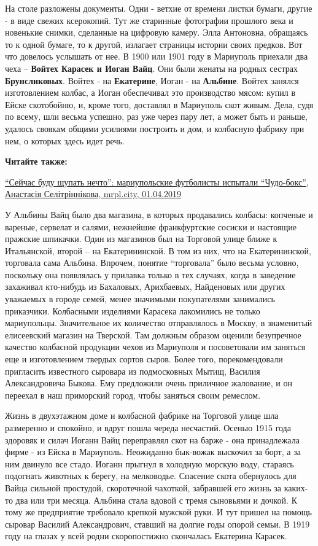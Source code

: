 На столе разложены документы. Одни - ветхие от времени листки бумаги, другие -
в виде свежих ксерокопий. Тут же старинные фотографии прошлого века и новенькие
снимки, сделанные на цифровую камеру. Элла Антоновна, обращаясь то к одной
бумаге, то к другой, излагает страницы истории своих предков. Вот что довелось
услышать от нее. В 1900 или 1901 году в Мариуполь приехали два чеха – \textbf{Войтех
Карасек и Иоган Вайц}. Они были женаты на родных сестрах \textbf{Брунсликовых}. Войтех -
на \textbf{Екатерине}, Иоган - на \textbf{Альбине}. Войтех занялся изготовлением колбас, а Иоган
обеспечивал это производство мясом: купил в Ейске скотобойню, и, кроме того,
доставлял в Мариуполь скот живым. Дела, судя по всему, шли весьма успешно, раз
уже через пару лет, а может быть и раньше, удалось своякам общими усилиями
построить и дом, и колбасную фабрику при нем, о которых здесь идет речь.

\textbf{Читайте также:} 

\href{https://mrpl.city/news/view/sejchas-budu-shhupat-nechto-mariupolskie-futbolisty-ispytali-chudoboks-video}{%
\enquote{Сейчас буду щупать нечто}: мариупольские футболисты испытали \enquote{Чудо-бокс}, Анастасія Селітріннікова, mrpl.city, 01.04.2019}

У Альбины Вайц было два магазина, в которых продавались колбасы: копченые и
вареные, сервелат и салями, нежнейшие франкфуртские сосиски и настоящие
пражские шпикачки. Один из магазинов был на Торговой улице ближе к
Итальянской, второй – на Екатерининской. В том из них, что на Екатерининской,
торговала сама Альбина. Впрочем, понятие \enquote{торговала} было весьма условно,
поскольку она появлялась у прилавка только в тех случаях, когда в заведение
захаживал кто-нибудь из Бахаловых, Арихбаевых, Найденовых или других уважаемых
в городе семей, менее значимыми покупателями занимались приказчики. Колбасными
изделиями Карасека лакомились не только мариупольцы. Значительное их
количество отправлялось в Москву, в знаменитый елисеевский магазин на
Тверской. Там должным образом оценили безупречное качество колбасной продукции
чехов из Мариуполя и посоветовали им заняться еще и изготовлением твердых
сортов сыров. Более того, порекомендовали пригласить известного сыровара из
подмосковных Мытищ, Василия Александровича Быкова. Ему предложили очень
приличное жалование, и он переехал в наш приморский город, чтобы заняться
своим ремеслом.

Жизнь в двухэтажном доме и колбасной фабрике на Торговой улице шла размеренно и
спокойно, и вдруг пошла череда несчастий. Осенью 1915 года здоровяк и силач
Иоганн Вайц переправлял скот на барже - она принадлежала фирме - из Ейска в
Мариуполь. Неожиданно бык-вожак выскочил за борт, а за ним двинуло все стадо.
Иоганн прыгнул в холодную морскую воду, стараясь подогнать животных к берегу,
на мелководье. Спасение скота обернулось для Вайца сильной простудой,
скоротечной чахоткой, забравшей его жизнь за каких-то два или три месяца.
Альбина стала вдовой с тремя сыновьями и дочкой. К тому же предприятие
требовало крепкой мужской руки. И тут пришел на помощь сыровар Василий
Александрович, ставший на долгие годы опорой семьи. В 1919 году на глазах у
всей родни скоропостижно скончалась Екатерина Карасек.

